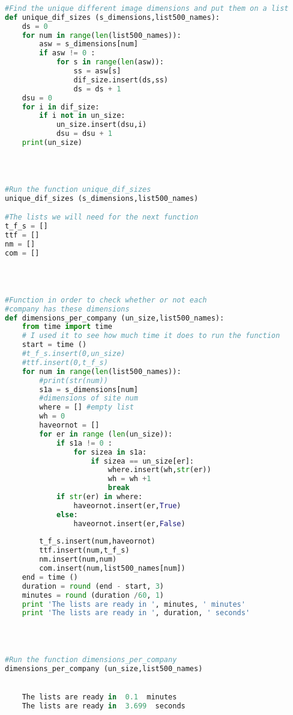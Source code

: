 \documentclass{article}
\begin{document}
\begin{lstlisting}[language=Python]
 
#Find the unique different image dimensions and put them on a list
def unique_dif_sizes (s_dimensions,list500_names):
    ds = 0
    for num in range(len(list500_names)):
        asw = s_dimensions[num]
        if asw != 0 :
            for s in range(len(asw)):
                ss = asw[s]
                dif_size.insert(ds,ss)
                ds = ds + 1    
    dsu = 0
    for i in dif_size:
        if i not in un_size:
            un_size.insert(dsu,i)
            dsu = dsu + 1
    print(un_size)          
 


 
#Run the function unique_dif_sizes
unique_dif_sizes (s_dimensions,list500_names)

#The lists we will need for the next function
t_f_s = []
ttf = []
nm = []
com = []
 


 
#Function in order to check whether or not each 
#company has these dimensions
def dimensions_per_company (un_size,list500_names):
    from time import time 
    # I used it to see how much time it does to run the function
    start = time ()
    #t_f_s.insert(0,un_size)
    #ttf.insert(0,t_f_s)
    for num in range(len(list500_names)): 
        #print(str(num))
        s1a = s_dimensions[num] 
        #dimensions of site num
        where = [] #empty list
        wh = 0
        haveornot = []
        for er in range (len(un_size)):
            if s1a != 0 :
                for sizea in s1a:
                    if sizea == un_size[er]:
                        where.insert(wh,str(er))
                        wh = wh +1
                        break
            if str(er) in where:
                haveornot.insert(er,True)                    
            else:
                haveornot.insert(er,False)
                    
        t_f_s.insert(num,haveornot)
        ttf.insert(num,t_f_s)
        nm.insert(num,num)
        com.insert(num,list500_names[num])
    end = time ()
    duration = round (end - start, 3)
    minutes = round (duration /60, 1)
    print 'The lists are ready in ', minutes, ' minutes'
    print 'The lists are ready in ', duration, ' seconds'
 


 
#Run the function dimensions_per_company
dimensions_per_company (un_size,list500_names)
 

    The lists are ready in  0.1  minutes
    The lists are ready in  3.699  seconds
    



\end{lstlisting}
\end{document}
